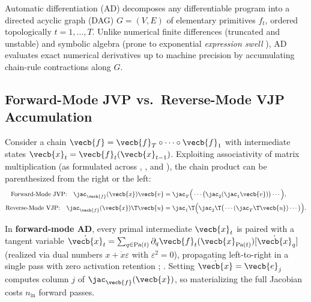 \documentclass[../../../../master.tex]{subfiles}
\begin{document}
Automatic differentiation (AD) decomposes any differentiable program into a directed acyclic graph (DAG) $G = (V, E)$ of elementary primitives $f_t$, ordered topologically $t = 1, \dots, T$. Unlike numerical finite differences (truncated and unstable) and symbolic algebra (prone to exponential \emph{expression swell} ), AD evaluates exact numerical derivatives up to machine precision by accumulating chain-rule contractions along $G$.

\subsection{Forward-Mode JVP vs.\ Reverse-Mode VJP Accumulation}
\label{subsec:matcalc:fwd_rev}

Consider a chain $\vecb{f} = \vecb{f}_T \circ \cdots \circ \vecb{f}_1$ with intermediate states $\vecb{x}_t = \vecb{f}_t(\vecb{x}_{t-1})$. Exploiting associativity of matrix multiplication (as formulated across , , and ), the chain product can be parenthesized from the right or the left:
\begin{align}
  \text{Forward-Mode JVP:}\quad
  \jac_{\vecb{f}}(\vecb{x})\vecb{v}
  &= \jac_T \Big(\cdots \big(\jac_2 (\jac_1 \vecb{v})\big)\cdots\Big),
  \label{eq:matcalc:jvp_assoc} \\
  \text{Reverse-Mode VJP:}\quad
  \jac_{\vecb{f}}(\vecb{x})\T \vecb{u}
  &= \jac_1\T \Big(\jac_2\T \big(\cdots (\jac_T\T \vecb{u})\cdots\big)\Big).
  \label{eq:matcalc:vjp_assoc}
\end{align}

In \textbf{forward-mode AD}, every primal intermediate $\vecb{x}_t$ is paired with a tangent variable $\dot{\vecb{x}}_t = \sum_{q \in \mathrm{Pa}(t)} \partial_{q} \vecb{f}_t(\vecb{x}_{\mathrm{Pa}(t)})[\dot{\vecb{x}}_q]$ (realized via dual numbers $x + \dot{x}\varepsilon$ with $\varepsilon^2 = 0$), propagating left-to-right in a single pass with zero activation retention ; . Setting $\dot{\vecb{x}} = \vecb{e}_j$ computes column $j$ of $\jac_{\vecb{f}}(\vecb{x})$, so materializing the full Jacobian costs $n_{\text{in}}$ forward passes.
\end{document}
